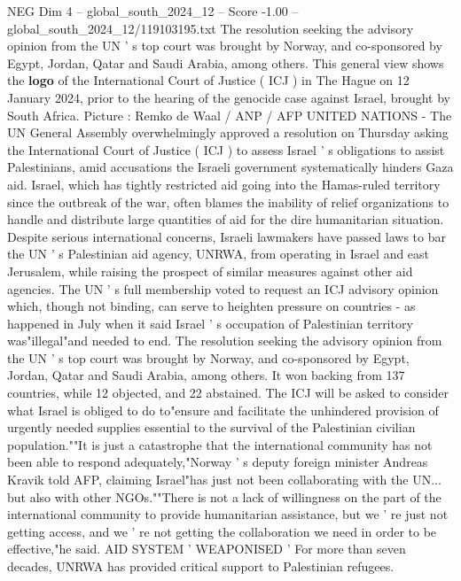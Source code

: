 \begin{textsample}{NEG Dim 4 – global\_south\_2024\_12 – Score -1.00 – global\_south\_2024\_12/119103195.txt}  \label{ex:f4_neg_201}
The resolution seeking the advisory opinion from the UN ' s top court was brought by Norway, and co-sponsored by Egypt, Jordan, Qatar and Saudi Arabia, among others.
This general view shows the \textbf{logo} of the International Court of Justice ( ICJ ) in The Hague on 12 January 2024, prior to the hearing of the genocide case against Israel, brought by South Africa.
Picture : Remko de Waal / ANP / AFP UNITED NATIONS - The UN General Assembly overwhelmingly approved a resolution on Thursday asking the International Court of Justice ( ICJ ) to assess Israel ' s obligations to assist Palestinians, amid accusations the Israeli government systematically hinders Gaza aid.
Israel, which has tightly restricted aid going into the Hamas-ruled territory since the outbreak of the war, often blames the inability of relief organizations to handle and distribute large quantities of aid for the dire humanitarian situation.
Despite serious international concerns, Israeli lawmakers have passed laws to bar the UN ' s Palestinian aid agency, UNRWA, from operating in Israel and east Jerusalem, while raising the prospect of similar measures against other aid agencies.
The UN ' s full membership voted to request an ICJ advisory opinion which, though not binding, can serve to heighten pressure on countries - as happened in July when it said Israel ' s occupation of Palestinian territory was"illegal"and needed to end.
The resolution seeking the advisory opinion from the UN ' s top court was brought by Norway, and co-sponsored by Egypt, Jordan, Qatar and Saudi Arabia, among others.
It won backing from 137 countries, while 12 objected, and 22 abstained.
The ICJ will be asked to consider what Israel is obliged to do to"ensure and facilitate the unhindered provision of urgently needed supplies essential to the survival of the Palestinian civilian population.""It is just a catastrophe that the international community has not been able to respond adequately,"Norway ' s deputy foreign minister Andreas Kravik told AFP, claiming Israel"has just not been collaborating with the UN... but also with other NGOs.""There is not a lack of willingness on the part of the international community to provide humanitarian assistance, but we ' re just not getting access, and we ' re not getting the collaboration we need in order to be effective,"he said.
AID SYSTEM ' WEAPONISED ' For more than seven decades, UNRWA has provided critical support to Palestinian refugees.

\end{textsample}
